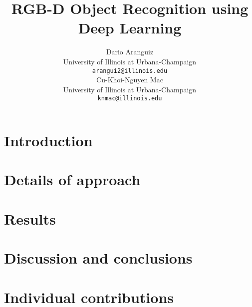 \documentclass{article} %
\title{RGB-D Object Recognition using Deep Learning}
\author{
Dario Aranguiz \\
University of Illinois at Urbana-Champaign \\
\texttt{arangui2@illinois.edu} \\
\And
Cu-Khoi-Nguyen Mac \\
University of Illinois at Urbana-Champaign \\
\texttt{knmac@illinois.edu} \\
}
\begin{document}
\maketitle

\begin{abstract}

\end{abstract}

\section{Introduction}



\section{Details of approach}



\section{Results}



\section{Discussion and conclusions}



\section{Individual contributions}

\end{document}
